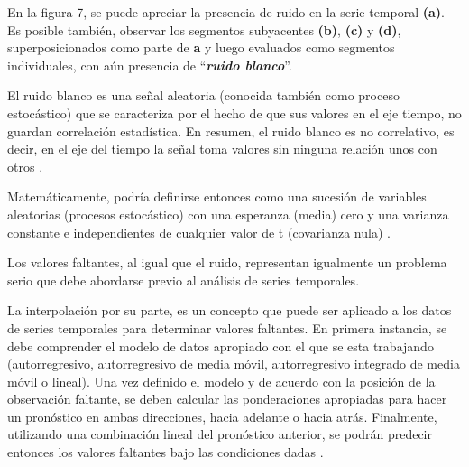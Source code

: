 En la figura 7, se puede apreciar la presencia de ruido en la serie temporal \textbf{(a)}. Es posible tambi\'en, observar los segmentos subyacentes \textbf{(b)}, \textbf{(c)} y \textbf{(d)}, superposicionados como parte de \textbf{a} y luego evaluados como segmentos individuales, con a\'un presencia de \enquote{\textit{\textbf{ruido blanco}}}.\par
El ruido blanco es una se\~nal aleatoria (conocida tambi\'en como proceso estoc\'astico) que se caracteriza por el hecho de que sus valores en el eje tiempo, no guardan correlaci\'on estad\'istica. En resumen, el ruido blanco es no correlativo, es decir, en el eje del tiempo la se\~nal toma valores sin ninguna relaci\'on unos con otros \cite{concepts}.\par
Matem\'aticamente, podr\'ia definirse entonces como una sucesi\'on de variables aleatorias (procesos estoc\'astico) con una esperanza (media) cero y una varianza constante e independientes de cualquier valor de t (covarianza nula) \cite{noise}.\par
Los valores faltantes, al igual que el ruido, representan igualmente un problema serio que debe abordarse previo al an\'alisis de series temporales.\par
La interpolaci\'on por su parte, es un concepto que puede ser aplicado a los datos de series temporales para determinar valores faltantes. En primera instancia, se debe comprender el modelo de datos apropiado con el que se esta trabajando (autorregresivo, autorregresivo de media m\'ovil, autorregresivo integrado de media m\'ovil o lineal). Una vez definido el modelo y de acuerdo con la posici\'on de la observaci\'on faltante, se deben calcular las ponderaciones apropiadas para hacer un pron\'ostico en ambas direcciones, hacia adelante o hacia atr\'as. Finalmente, utilizando una combinaci\'on lineal del pron\'ostico anterior, se podr\'an predecir entonces los valores faltantes bajo las condiciones dadas \cite{concepts}.